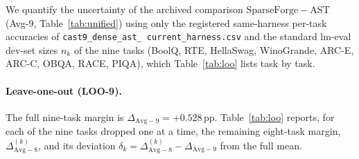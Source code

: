 \documentclass{article}
\begin{document}
We quantify the uncertainty of the archived comparison
$\mathrm{SparseForge}- \mathrm{AST}$ (Avg-9, Table~\ref{tab:unified}) using only
the registered same-harness per-task accuracies of
\texttt{cast9\_\allowbreak dense\_\allowbreak ast\_\allowbreak
current\_\allowbreak harness.csv} and the standard
lm-eval dev-set sizes $n_k$ of the nine tasks
(BoolQ, RTE, HellaSwag, WinoGrande, ARC-E, ARC-C, OBQA, RACE,
PIQA), which Table~\ref{tab:loo} lists task by task.

\paragraph{Leave-one-out (LOO-9).}
The full nine-task margin is
$\Delta_{\mathrm{Avg}{-}9}=+0.528$\,pp. Table~\ref{tab:loo} reports, for
each of the nine tasks dropped one at a time, the remaining eight-task
margin, $\Delta_{\mathrm{Avg}{-}8}^{(k)}$, and its deviation
$\delta_k=\Delta_{\mathrm{Avg}{-}8}^{(k)}-\Delta_{\mathrm{Avg}{-}9}$
from the full mean.
\end{document}
